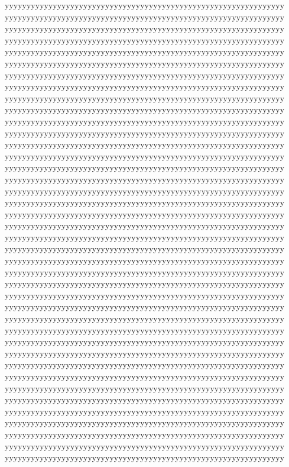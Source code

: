 {yyyyyyyyyyyyyyyyyyyyyyyyyyyyyyyyyyyyyyyyyyyyyyyyyyyyyyyyyyyyyyyy%
yyyyyyyyyyyyyyyyyyyyyyyyyyyyyyyyyyyyyyyyyyyyyyyyyyyyyyyyyyyyyyyy%
yyyyyyyyyyyyyyyyyyyyyyyyyyyyyyyyyyyyyyyyyyyyyyyyyyyyyyyyyyyyyyyy%
yyyyyyyyyyyyyyyyyyyyyyyyyyyyyyyyyyyyyyyyyyyyyyyyyyyyyyyyyyyyyyyy%
yyyyyyyyyyyyyyyyyyyyyyyyyyyyyyyyyyyyyyyyyyyyyyyyyyyyyyyyyyyyyyyy%
yyyyyyyyyyyyyyyyyyyyyyyyyyyyyyyyyyyyyyyyyyyyyyyyyyyyyyyyyyyyyyyy%
yyyyyyyyyyyyyyyyyyyyyyyyyyyyyyyyyyyyyyyyyyyyyyyyyyyyyyyyyyyyyyyy%
yyyyyyyyyyyyyyyyyyyyyyyyyyyyyyyyyyyyyyyyyyyyyyyyyyyyyyyyyyyyyyyy%
yyyyyyyyyyyyyyyyyyyyyyyyyyyyyyyyyyyyyyyyyyyyyyyyyyyyyyyyyyyyyyyy%
yyyyyyyyyyyyyyyyyyyyyyyyyyyyyyyyyyyyyyyyyyyyyyyyyyyyyyyyyyyyyyyy%
yyyyyyyyyyyyyyyyyyyyyyyyyyyyyyyyyyyyyyyyyyyyyyyyyyyyyyyyyyyyyyyy%
yyyyyyyyyyyyyyyyyyyyyyyyyyyyyyyyyyyyyyyyyyyyyyyyyyyyyyyyyyyyyyyy%
yyyyyyyyyyyyyyyyyyyyyyyyyyyyyyyyyyyyyyyyyyyyyyyyyyyyyyyyyyyyyyyy%
yyyyyyyyyyyyyyyyyyyyyyyyyyyyyyyyyyyyyyyyyyyyyyyyyyyyyyyyyyyyyyyy%
yyyyyyyyyyyyyyyyyyyyyyyyyyyyyyyyyyyyyyyyyyyyyyyyyyyyyyyyyyyyyyyy%
yyyyyyyyyyyyyyyyyyyyyyyyyyyyyyyyyyyyyyyyyyyyyyyyyyyyyyyyyyyyyyyy%
yyyyyyyyyyyyyyyyyyyyyyyyyyyyyyyyyyyyyyyyyyyyyyyyyyyyyyyyyyyyyyyy%
yyyyyyyyyyyyyyyyyyyyyyyyyyyyyyyyyyyyyyyyyyyyyyyyyyyyyyyyyyyyyyyy%
yyyyyyyyyyyyyyyyyyyyyyyyyyyyyyyyyyyyyyyyyyyyyyyyyyyyyyyyyyyyyyyy%
yyyyyyyyyyyyyyyyyyyyyyyyyyyyyyyyyyyyyyyyyyyyyyyyyyyyyyyyyyyyyyyy%
yyyyyyyyyyyyyyyyyyyyyyyyyyyyyyyyyyyyyyyyyyyyyyyyyyyyyyyyyyyyyyyy%
yyyyyyyyyyyyyyyyyyyyyyyyyyyyyyyyyyyyyyyyyyyyyyyyyyyyyyyyyyyyyyyy%
yyyyyyyyyyyyyyyyyyyyyyyyyyyyyyyyyyyyyyyyyyyyyyyyyyyyyyyyyyyyyyyy%
yyyyyyyyyyyyyyyyyyyyyyyyyyyyyyyyyyyyyyyyyyyyyyyyyyyyyyyyyyyyyyyy%
yyyyyyyyyyyyyyyyyyyyyyyyyyyyyyyyyyyyyyyyyyyyyyyyyyyyyyyyyyyyyyyy%
yyyyyyyyyyyyyyyyyyyyyyyyyyyyyyyyyyyyyyyyyyyyyyyyyyyyyyyyyyyyyyyy%
yyyyyyyyyyyyyyyyyyyyyyyyyyyyyyyyyyyyyyyyyyyyyyyyyyyyyyyyyyyyyyyy%
yyyyyyyyyyyyyyyyyyyyyyyyyyyyyyyyyyyyyyyyyyyyyyyyyyyyyyyyyyyyyyyy%
yyyyyyyyyyyyyyyyyyyyyyyyyyyyyyyyyyyyyyyyyyyyyyyyyyyyyyyyyyyyyyyy%
yyyyyyyyyyyyyyyyyyyyyyyyyyyyyyyyyyyyyyyyyyyyyyyyyyyyyyyyyyyyyyyy%
yyyyyyyyyyyyyyyyyyyyyyyyyyyyyyyyyyyyyyyyyyyyyyyyyyyyyyyyyyyyyyyy%
yyyyyyyyyyyyyyyyyyyyyyyyyyyyyyyyyyyyyyyyyyyyyyyyyyyyyyyyyyyyyyyy%
yyyyyyyyyyyyyyyyyyyyyyyyyyyyyyyyyyyyyyyyyyyyyyyyyyyyyyyyyyyyyyyy%
yyyyyyyyyyyyyyyyyyyyyyyyyyyyyyyyyyyyyyyyyyyyyyyyyyyyyyyyyyyyyyyy%
yyyyyyyyyyyyyyyyyyyyyyyyyyyyyyyyyyyyyyyyyyyyyyyyyyyyyyyyyyyyyyyy%
yyyyyyyyyyyyyyyyyyyyyyyyyyyyyyyyyyyyyyyyyyyyyyyyyyyyyyyyyyyyyyyy%
yyyyyyyyyyyyyyyyyyyyyyyyyyyyyyyyyyyyyyyyyyyyyyyyyyyyyyyyyyyyyyyy%
yyyyyyyyyyyyyyyyyyyyyyyyyyyyyyyyyyyyyyyyyyyyyyyyyyyyyyyyyyyyyyyy%
yyyyyyyyyyyyyyyyyyyyyyyyyyyyyyyyyyyyyyyyyyyyyyyyyyyyyyyyyyyyyyyy%
yyyyyyyyyyyyyyyyyyyyyyyyyyyyyyyyyyyyyyyyyyyyyyyyyyyyyyyyyyyyyyyy%
}

